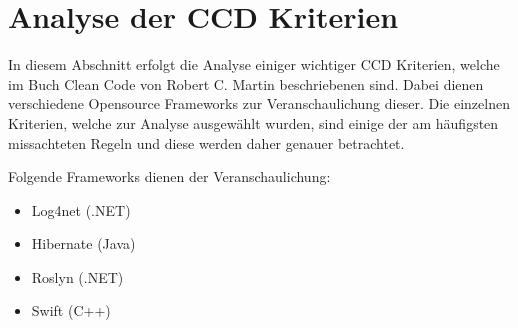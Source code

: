 \chapter{Analyse der CCD Kriterien}

\SuperPar In diesem Abschnitt erfolgt die Analyse einiger wichtiger CCD Kriterien, welche im Buch Clean Code von Robert C. Martin beschriebenen sind. Dabei dienen verschiedene Opensource Frameworks zur Veranschaulichung dieser. Die einzelnen Kriterien, welche zur Analyse ausgewählt wurden, sind einige der am häufigsten missachteten Regeln und diese werden daher genauer betrachtet.

\SuperPar Folgende Frameworks dienen der Veranschaulichung:

\begin{itemize}
	\item Log4net (.NET)
	\item Hibernate (Java)
	\item Roslyn (.NET)
	\item Swift (C++)
\end{itemize}
\newpage